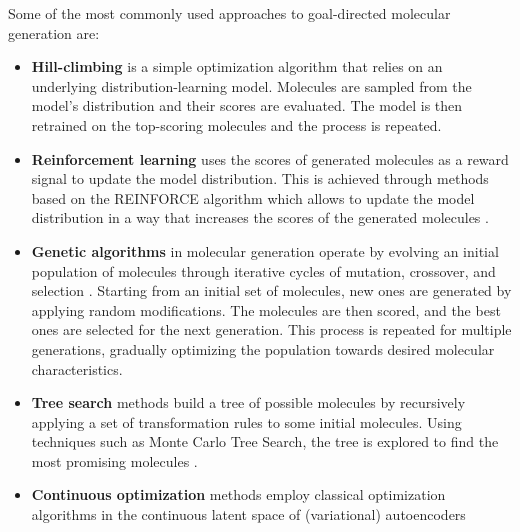 Some of the most commonly used approaches to goal-directed molecular generation are:
\begin{itemize}
      \item \textbf{Hill-climbing}
            \citep{seglerGeneratingFocusedMolecule2018,xieMARSMarkovMolecular2021,thomasAugmentedHillClimbIncreases2022}
            is a simple optimization algorithm that relies on an underlying distribution-learning model.
            Molecules are sampled from the model's distribution and their scores are evaluated.
            The model is then retrained on the top-scoring molecules and the process is repeated.
      \item \textbf{Reinforcement learning} uses the scores of generated molecules as a reward signal to update
            the model distribution. This is achieved through methods based on the REINFORCE algorithm
            \citep{williamsSimpleStatisticalGradientfollowing1992} which allows to update the model
            distribution in a way that increases the scores of the generated molecules
            \citep{olivecronaMolecularDenovoDesign2017,thomasAugmentedHillClimbIncreases2022,youGraphConvolutionalPolicy2019,guoAugmentedMemoryCapitalizing2023}.
      \item \textbf{Genetic algorithms} in molecular generation operate by evolving an initial
            population of molecules through iterative cycles of mutation, crossover, and selection
            \citep{jensenGraphbasedGeneticAlgorithm2019,nigamGenerativeModelsSuperfast2021,yoshikawaPopulationbasedNovoMolecule2018}.
            Starting from an initial set of molecules, new ones are generated by applying
            random modifications. The molecules are then scored, and the best ones are
            selected for the next generation. This process is repeated for multiple generations,
            gradually optimizing the population towards desired molecular characteristics.
      \item \textbf{Tree search} methods build a tree of possible molecules by recursively applying a set of transformation rules
            to some initial molecules. Using techniques such as Monte Carlo Tree Search, the tree is
            explored to find the most promising molecules \citep{yangChemTSEfficientPython2017,jensenGraphbasedGeneticAlgorithm2019}.
      \item \textbf{Continuous optimization} methods employ classical optimization algorithms in the continuous
            latent space of (variational) autoencoders
            \citep{gomez-bombarelliAutomaticChemicalDesign2018,kusnerGrammarVariationalAutoencoder2017,winterEfficientMultiobjectiveMolecular2019}

\end{itemize}
